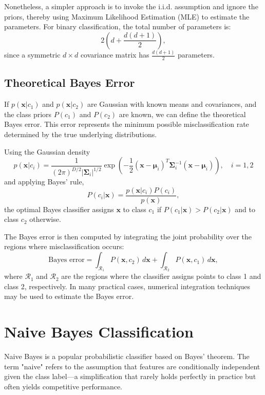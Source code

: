 \documentclass[12pt]{article}
\begin{document}
Nonetheless, a simpler approach is to invoke the i.i.d. assumption and ignore the priors, thereby using Maximum Likelihood Estimation (MLE) to estimate the parameters. For binary classification, the total number of parameters is:
\[
2 \left( d + \frac{d(d+1)}{2} \right),
\]
since a symmetric \(d \times d\) covariance matrix has \(\frac{d(d+1)}{2}\) parameters.

\subsection{Theoretical Bayes Error}
If \(p(\bm{x}|c_1)\) and \(p(\bm{x}|c_2)\) are Gaussian with known means and covariances, and the class priors \(P(c_1)\) and \(P(c_2)\) are known, we can define the theoretical Bayes error. This error represents the minimum possible misclassification rate determined by the true underlying distributions.

Using the Gaussian density
\begin{equation}
p(\bm{x} | c_i) = \frac{1}{(2\pi)^{D/2} |\bm{\Sigma}_i|^{1/2}} \exp\left(-\frac{1}{2}(\bm{x} - \bm{\mu}_i)^T \bm{\Sigma}_i^{-1} (\bm{x} - \bm{\mu}_i)\right), \quad i = 1,2
\end{equation}
and applying Bayes' rule,
\begin{equation}
P(c_i | \bm{x}) = \frac{p(\bm{x} | c_i) P(c_i)}{p(\bm{x})},
\end{equation}
the optimal Bayes classifier assigns \(\bm{x}\) to class \(c_1\) if \(P(c_1|\bm{x}) > P(c_2|\bm{x})\) and to class \(c_2\) otherwise.

The Bayes error is then computed by integrating the joint probability over the regions where misclassification occurs:
\begin{equation}
\text{Bayes error} = \int_{\mathcal{R}_1} P(\bm{x}, c_2) \, d\bm{x} + \int_{\mathcal{R}_2} P(\bm{x}, c_1) \, d\bm{x},
\end{equation}
where \(\mathcal{R}_1\) and \(\mathcal{R}_2\) are the regions where the classifier assigns points to class 1 and class 2, respectively. In many practical cases, numerical integration techniques may be used to estimate the Bayes error.

\section{Naive Bayes Classification}
Naive Bayes is a popular probabilistic classifier based on Bayes' theorem. The term "naive" refers to the assumption that features are conditionally independent given the class label---a simplification that rarely holds perfectly in practice but often yields competitive performance.
\end{document}
